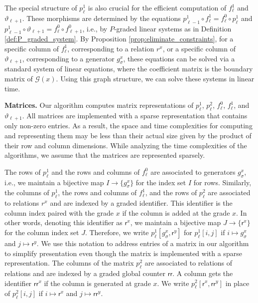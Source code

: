 \documentclass[english,a4paper,nolineno,cleveref]{socg-lipics-v2021}
\def\rsf{\mathsf{r}}
\def\rrsf{\mathsf{rr}}
\begin{document}
The special structure of $p_\ell^1$ is also crucial for the efficient computation of $f_\ell^1$ and $\vartheta_{\ell+1}$. These morphisms are determined by the equations $p^1_{\ell\minus 1}\circ f^1_{\ell}=f_\ell^0\circ p_\ell^1$ and $p_{\ell\minus 1}^1\circ \vartheta_{\ell+1}=f_\ell^0\circ f_{\ell+1}^0$, i.e., by $P$-graded linear systems as in Definition \ref{def:P_graded_system}. By Proposition \ref{prop:eliminate_constraints}, for a specific column of $f_\ell^1$, corresponding to a relation $r^x$, or a specific column of $\vartheta_{\ell+1}$, corresponding to a generator $g_\sigma^x$, these equations can be solved via a standard system of linear equations, where the coefficient matrix is the boundary matrix of $\mathcal{G}(x)$. Using this graph structure, we can solve these systems in linear time.   

\textbf{Matrices.} 
Our algorithm computes matrix representations of $p^1_\ell$, $p^2_\ell$, $f_\ell^0$, $f_\ell^1$, and $\vartheta_{\ell+1}$. All matrices are implemented with a sparse representation that contains only non-zero entries. As a result, the space and time complexities for computing and representing them may be less than their actual size given by the product of their row and column dimensions. While analyzing the time complexities of the algorithms, we assume that the matrices
are represented sparsely. 


The rows of $p_\ell^1$ and the rows and columns of $f_\ell^0$ are associated to generators $g_\sigma^{x}$, i.e., we maintain a bijective map $I\rightarrow \{g_\sigma^{x}\}$ for the index set $I$ for rows. Similarly, the columns of $p_\ell^1$, the rows and columns of $f_\ell^1$, and the rows of $p_\ell^2$ are associated to relations $r^x$ and are indexed by a graded identifier. This identifier is the column index paired with the grade $x$ if the column is added at the grade $x$. In other words, denoting this identifier as $\rsf^x$, we maintain a bijective map $J\rightarrow \{\rsf^x\}$ for the column index set $J$. Therefore, we write $p_\ell^1[g_\sigma^x,\rsf^y]$ for $p_\ell^1[i,j]$ if $i\mapsto g_\sigma^x$ and $j\mapsto \rsf^y$. We use this notation to address entries of a matrix in our algorithm to simplify presentation even though the matrix is implemented with a sparse representation. The columns of the matrix $p^2_\ell$ are associated to relations of relations and are indexed by a graded global counter
$\rrsf$. A column gets the identifier $\rrsf^x$ if the column is generated at grade
$x$. We write $p^2_\ell[\rsf^x,\rrsf^y]$ in place of $p^2_\ell[i,j]$ if $i\mapsto \rsf^x$ and $j\mapsto \rrsf^y$.
\end{document}
